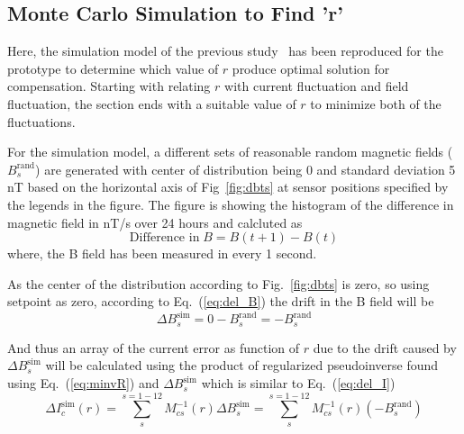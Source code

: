 \subsection{Monte Carlo Simulation to Find 'r'}\label{sec:mont}

Here, the simulation model of the previous study~\cite{bea} has been reproduced for the prototype to determine which value of $r$ produce optimal solution for compensation. Starting with relating $r$ with current fluctuation and field fluctuation, the section ends with a suitable value of $r$ to minimize both of the fluctuations.

For the simulation model, a different sets of reasonable random magnetic fields ($B_s^{\text{rand}}$) are generated with center of distribution being 0 and standard deviation 5 nT  based on the horizontal axis of Fig~\ref{fig:dbts} at sensor positions specified by the legends in the figure. The figure is showing the histogram of the difference in magnetic field in nT/s over 24 hours and calcluted as 
\begin{equation}
    \text{Difference in}\;B=B(t+1)-B(t)
\end{equation}
where, the B field has been measured in every 1 second.


\FloatBarrier
As the center of the distribution according to Fig.~\ref{fig:dbts} is zero, so using setpoint as zero, according to Eq.~(\ref{eq:del_B}) the drift in the B field will be  
\begin{equation}\label{eq:del_Bs}
    \Delta B_s^{\text{sim}} = 0 - B_s^{\text{rand}}=-B_s^{\text{rand}}
\end{equation}

And thus an array of the current error  as function of $r$ due to the drift caused by $\Delta B_s^{\text{sim}}$ will be calculated using the product of regularized pseudoinverse found using Eq.~(\ref{eq:minvR}) and $\Delta B_s^{\text{sim}}$ which is similar to Eq.~(\ref{eq:del_I})
\begin{equation}\label{eq:del_Is}
    \Delta I_c^{\text{sim}}(r) =\sum_s^{s=1-12} M^{-1}_{cs}(r) \Delta B_s^{\text{sim}}=\sum_s^{s=1-12} M^{-1}_{cs}(r) (-B_s^{\text{rand}})
\end{equation}

